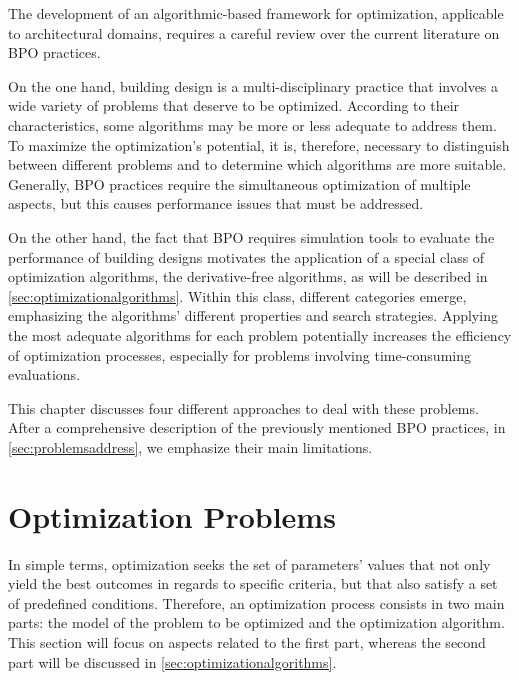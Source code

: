 \label{chap:back}

The development of an algorithmic-based framework for optimization, applicable to architectural domains, requires a careful review over the current literature on \ac{BPO} practices.
	
On the one hand, building design is a multi-disciplinary practice that involves a wide variety of problems that deserve to be optimized. According to their characteristics, some algorithms may be more or less adequate to address them. To maximize the optimization's potential, it is, therefore, necessary to distinguish between different problems and to determine which algorithms are more suitable. Generally, \ac{BPO} practices require the simultaneous optimization of multiple aspects, but this causes performance issues that must be addressed. 
	
On the other hand, the fact that \ac{BPO} requires simulation tools to evaluate the performance of building designs motivates the application of a special class of optimization algorithms, the derivative-free algorithms, as will be described in \cref{sec:optimizationalgorithms}. Within this class, different categories emerge, emphasizing the algorithms' different properties and search strategies. Applying the most adequate algorithms for each problem potentially increases the efficiency of optimization processes, especially for problems involving time-consuming evaluations. 
	
This chapter discusses four different approaches to deal with these problems. After a comprehensive description of the previously mentioned \ac{BPO} practices, in \cref{sec:problemsaddress}, we emphasize their main limitations. 
	
\section{Optimization Problems}
\label{sec:optimizationproblems}	
In simple terms, optimization seeks the set of parameters' values that not only yield the best outcomes in regards to specific criteria, but that also satisfy a set of predefined conditions. Therefore, an optimization process consists in two main parts: the model of the problem to be optimized and the optimization algorithm. This section  will focus on aspects related to the first part, whereas the second part will be discussed in \cref{sec:optimizationalgorithms}.
	
